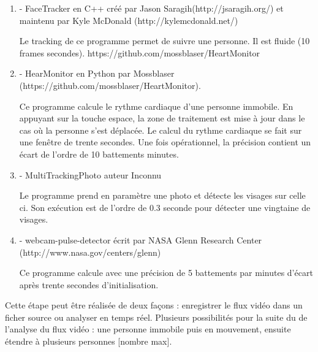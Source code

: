 \documentclass[12pt,a4paper]{article}
\begin{document}
\begin{enumerate}

\item[] - FaceTracker en C++ 
créé par Jason Saragih(http://jsaragih.org/) et maintenu par Kyle McDonald (http://kylemcdonald.net/)

Le tracking de ce programme permet de suivre une personne. Il est fluide (10 frames secondes).
https://github.com/mossblaser/HeartMonitor
\item[] - HearMonitor en Python par Mossblaser (https://github.com/mossblaser/HeartMonitor).

Ce programme calcule le rythme cardiaque d'une personne immobile. En appuyant sur la touche espace, la zone de traitement est mise à jour dans le cas où la personne s'est déplacée. Le calcul du rythme cardiaque se fait sur une fenêtre de trente secondes. 
Une fois opérationnel, la précision contient un écart de l'ordre de 10 battements minutes.

\item[] - MultiTrackingPhoto auteur Inconnu 

Le programme prend en paramètre une photo et détecte les visages sur celle ci.
Son exécution est de l'ordre de 0.3 seconde pour détecter une vingtaine de visages.

 \item[] - webcam-pulse-detector écrit par NASA Glenn Research Center \\(http://www.nasa.gov/centers/glenn)

Ce programme calcule avec une précision de 5 battements par minutes d'écart après trente secondes d'initialisation.

\end{enumerate}



Cette étape peut être réalisée de deux façons : enregistrer le flux vidéo dans un ficher source ou analyser en temps réel.
Plusieurs possibilités pour la suite du de l'analyse du flux vidéo : une personne immobile puis en mouvement, ensuite étendre à plusieurs personnes [nombre max].
\end{document}

